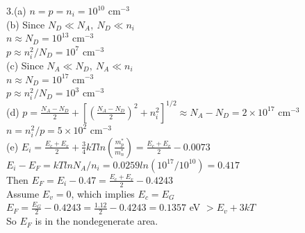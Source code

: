 \documentclass[11pt,oneside,a4paper]{article}
\begin{document}
3.\:(a) \(n=p=n_i=10^{10}\) cm\(^{-3}\) \\

\quad (b) Since \(N_D\ll N_A,\ N_D\ll n_i\) \\

\hspace{8.5mm} \(n\approx N_D=10^{13}\) cm\(^{-3}\) \\

\hspace{8.5mm} \(p\approx n_i^2/N_D=10^7\) cm\(^{-3}\) \\

\quad (c) Since \(N_A\ll N_D,\ N_A\ll n_i\) \\

\hspace{8.5mm} \(n\approx N_D=10^{17}\) cm\(^{-3}\) \\

\hspace{8.5mm} \(p\approx n_i^2/N_D=10^3\) cm\(^{-3}\) \\

\quad (d) \(p=\frac{N_A-N_D}{2}+\left[\left(\frac{N_A-N_D}{2}\right)^2+n_i^2\right]^{1/2}\approx N_A-N_D=2\times10^{17}\) cm\(^{-3}\) \\

\hspace{8.5mm} \(n=n_i^2/p=5\times10^2\) cm\(^{-3}\) \\

\quad (e) \(E_i=\frac{E_c+E_v}{2}+\frac{3}{4}kTln\left(\frac{m_p^*}{m_n^*}\right)=\frac{E_c+E_v}{2}-0.0073\) \\

\hspace{8.5mm} \(E_i-E_F=kTlnN_A/n_i=0.0259ln(10^{17}/10^{10})=0.417\) \\

\hspace{8.5mm} Then \(E_F=E_i-0.47=\frac{E_c+E_v}{2}-0.4243\) \\

\hspace{8.5mm} Assume \(E_v=0\), which implies \(E_c=E_G\) \\

\hspace{8.5mm} \(E_F=\frac{E_G}{2}-0.4243=\frac{1.12}{2}-0.4243=0.1357\) eV \(>E_v+3kT\) \\

\hspace{8.5mm} So \(E_F\) is in the nondegenerate area. \\
\\
\end{document}
